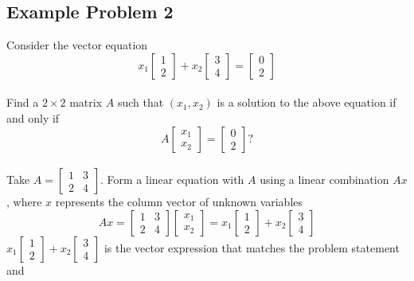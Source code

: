 \subsection{Example Problem 2}
Consider the vector equation 
\[
  x_1 \begin{bmatrix}
    1 \\ 2
  \end{bmatrix} + x_2 \begin{bmatrix}
    3 \\ 4
  \end{bmatrix} = \begin{bmatrix}
    0 \\ 2
  \end{bmatrix}
\]
\\[8pt]
Find a $2 \times 2$ matrix $A$ such that $(x_1, x_2)$ is a solution to the above
equation if and only if
\[
  A \begin{bmatrix}
    x_1 \\ x_2
  \end{bmatrix} = \begin{bmatrix}
    0 \\ 2
  \end{bmatrix}?
\]
\\[8pt]
Take $A = \begin{bmatrix}
  1 & 3 \\
  2 & 4
\end{bmatrix}$. Form a linear equation with $A$
using a linear combination $Ax$, where $x$ represents the column vector
of unknown variables
\[
  Ax = \begin{bmatrix}
    1 & 3 \\
    2 & 4
  \end{bmatrix} \begin{bmatrix}
    x_1 \\ x_2
  \end{bmatrix} = x_1 \begin{bmatrix}
    1 \\ 2
  \end{bmatrix} + x_2 \begin{bmatrix}
    3 \\ 4
  \end{bmatrix}
\]
$x_1 \begin{bmatrix}
  1 \\ 2
\end{bmatrix} + x_2 \begin{bmatrix}
  3 \\ 4
\end{bmatrix}$ is the vector expression that matches the problem statement and
